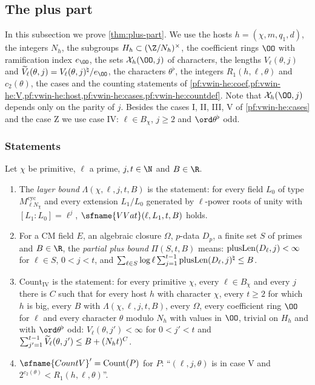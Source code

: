 \subsection{The plus part}\label{sec:pf:vwin:plus}

In this subsection we prove \cref{thm:plus-part}. We use the hosts $h=(\chi,m,q_1,d)$, the integers $N_h$, the subgroups
$H_h\subset(\Z/N_h)^\times$, the coefficient rings $\OO$ with ramification index $e_\OO$, the sets $\vwinX_h(\OO,j)$ of
characters, the lengths $V_\ell(\theta,j)$ and $\vwinVt_\ell(\theta,j)=V_\ell(\theta,j)^\natural/e_\OO$, the characters
$\theta^\flat$, the integers $R_1(h,\ell,\theta)$ and $c_2(\theta)$, the cases and the counting statements of
\cref{pf:vwin-he:coef,pf:vwin-he:V,pf:vwin-he:host,pf:vwin-he:cases,pf:vwin-he:countdef}. Note that
$\vwinX_h(\OO,j)$ depends only on the parity of $j$. Besides the cases I, II, III, V of \cref{pf:vwin-he:cases} and the
case Z we use case IV: $\ell\in B_\chi$, $j\ge2$ and $\ord\theta^\flat$ odd.

\subsubsection{Statements}

\begin{definition}\label{pf:vwin:plusdefs}
Let $\chi$ be primitive, $\ell$ a prime, $j,t\in\N$ and $B\in\R$.
\begin{enumerate}[label=(\alph*)]
\item The \emph{layer bound} $\Lambda(\chi,\ell,j,t,B)$ is the statement: for every field $L_0$ of type
$M^{\mathrm{cyc}}_{\ell N_\chi}$ and every extension $L_1/L_0$ generated by $\ell$-power roots of unity with $[L_1:L_0]=\ell^j$,
$\sfname{VVat}(\ell,L_1,t,B)$ holds.
\item For a CM field $E$, an algebraic closure $\Omega$, $p$-data $D_p$, a finite set $S$ of primes and $B\in\R$, the
\emph{partial plus bound} $\Pi(S,t,B)$ means: $\mathrm{plusLen}(D_\ell,j)<\infty$ for $\ell\in S$, $0<j<t$, and
$\sum_{\ell\in S}\log\ell\sum_{j=1}^{t-1}\mathrm{plusLen}(D_\ell,j)^\natural\le B$.
\item $\mathrm{Count}_{\mathrm{IV}}$ is the statement: for every primitive $\chi$, every $\ell\in B_\chi$ and every $j$
there is $C$ such that for every host $h$ with character $\chi$, every $t\ge2$ for which $h$ is big, every $B$ with
$\Lambda(\chi,\ell,j,t,B)$, every $\Omega$, every coefficient ring $\OO$ for $\ell$ and every character $\theta$ modulo
$N_h$ with values in $\OO$, trivial on $H_h$ and with $\ord\theta^\flat$ odd: $V_\ell(\theta,j')<\infty$ for $0<j'<t$ and
$\sum_{j'=1}^{t-1}\widetilde V_\ell(\theta,j')\le B+(N_ht)^C$.
\item $\sfname{CountV}'=\mathrm{Count}(P)$ for $P$: ``$(\ell,j,\theta)$ is in case V and $2^{c_2(\theta)}<R_1(h,\ell,\theta)$''.
\end{enumerate}
\end{definition}

